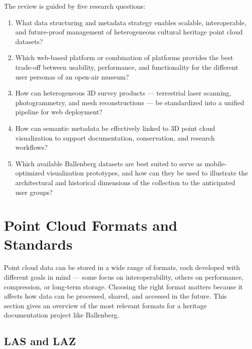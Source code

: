 \documentclass[]{report}
\begin{document}
The review is guided by five research questions:

\begin{enumerate}
  \item What data structuring and metadata strategy enables scalable, interoperable, and
        future-proof management of heterogeneous cultural heritage point cloud datasets?
  \item Which web-based platform or combination of platforms provides the best trade-off between
        usability, performance, and functionality for the different user personas of an
        open-air museum?
  \item How can heterogeneous 3D survey products --- terrestrial laser scanning,
        photogrammetry, and mesh reconstructions --- be standardized into a unified
        pipeline for web deployment?
  \item How can semantic metadata be effectively linked to 3D point cloud visualization
        to support documentation, conservation, and research workflows?
  \item Which available Ballenberg datasets are best suited to serve as mobile-optimized
        visualization prototypes, and how can they be used to illustrate the architectural
        and historical dimensions of the collection to the anticipated user groups?
\end{enumerate}


\section{Point Cloud Formats and Standards}
\label{sec:formats}

Point cloud data can be stored in a wide range of formats, each developed with different goals
in mind --- some focus on interoperability, others on performance, compression, or long-term
storage. Choosing the right format matters because it affects how data can be processed, shared,
and accessed in the future. This section gives an overview of the most relevant formats for a
heritage documentation project like Ballenberg.

\subsection{LAS and LAZ}
\end{document}
